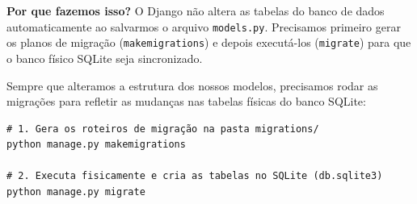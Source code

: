 \documentclass[12pt,a4paper]{article}
\begin{document}
\newpage

\begin{boxAtividade}
\textbf{Por que fazemos isso?} O Django não altera as tabelas do banco de dados automaticamente ao salvarmos o arquivo \texttt{models.py}. Precisamos primeiro gerar os planos de migração (\texttt{makemigrations}) e depois executá-los (\texttt{migrate}) para que o banco físico SQLite seja sincronizado.

Sempre que alteramos a estrutura dos nossos modelos, precisamos rodar as migrações para refletir as mudanças nas tabelas físicas do banco SQLite:
\begin{boxCodigo}
\begin{verbatim}
# 1. Gera os roteiros de migração na pasta migrations/
python manage.py makemigrations

# 2. Executa fisicamente e cria as tabelas no SQLite (db.sqlite3)
python manage.py migrate
\end{verbatim}
\end{boxCodigo}
\end{boxAtividade}
\end{document}
